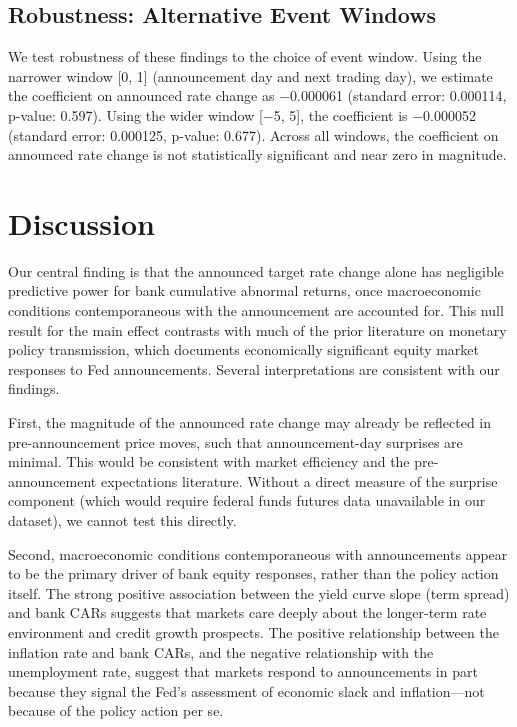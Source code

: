 \documentclass{article}
\begin{document}
\subsection{Robustness: Alternative Event Windows}

We test robustness of these findings to the choice of event window. Using the narrower window [0, 1] (announcement day and next trading day), we estimate the coefficient on announced rate change as −0.000061 (standard error: 0.000114, p-value: 0.597). Using the wider window [−5, 5], the coefficient is −0.000052 (standard error: 0.000125, p-value: 0.677). Across all windows, the coefficient on announced rate change is not statistically significant and near zero in magnitude.

\section{Discussion}

Our central finding is that the announced target rate change alone has negligible predictive power for bank cumulative abnormal returns, once macroeconomic conditions contemporaneous with the announcement are accounted for. This null result for the main effect contrasts with much of the prior literature on monetary policy transmission, which documents economically significant equity market responses to Fed announcements. Several interpretations are consistent with our findings.

First, the magnitude of the announced rate change may already be reflected in pre-announcement price moves, such that announcement-day surprises are minimal. This would be consistent with market efficiency and the pre-announcement expectations literature. Without a direct measure of the surprise component (which would require federal funds futures data unavailable in our dataset), we cannot test this directly.

Second, macroeconomic conditions contemporaneous with announcements appear to be the primary driver of bank equity responses, rather than the policy action itself. The strong positive association between the yield curve slope (term spread) and bank CARs suggests that markets care deeply about the longer-term rate environment and credit growth prospects. The positive relationship between the inflation rate and bank CARs, and the negative relationship with the unemployment rate, suggest that markets respond to announcements in part because they signal the Fed's assessment of economic slack and inflation—not because of the policy action per se.
\end{document}

